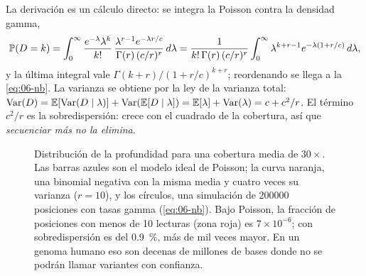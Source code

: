 \begin{simbolos}
\end{simbolos}

La derivación es un cálculo directo: se integra la Poisson contra la densidad gamma,
\[
\mathbb{P}(D=k)=\int_0^\infty \frac{e^{-\lambda}\lambda^k}{k!}\,\frac{\lambda^{r-1}e^{-\lambda r/c}}{\Gamma(r)\,(c/r)^r}\,d\lambda
=\frac{1}{k!\,\Gamma(r)\,(c/r)^r}\int_0^\infty \lambda^{k+r-1}e^{-\lambda(1+r/c)}\,d\lambda,
\]
y la última integral vale $\Gamma(k+r)/(1+r/c)^{k+r}$; reordenando se llega a la \cref{eq:06-nb}. La varianza se obtiene por la ley de la varianza total: $\operatorname{Var}(D)=\mathbb{E}[\operatorname{Var}(D\mid\lambda)]+\operatorname{Var}(\mathbb{E}[D\mid\lambda])=\mathbb{E}[\lambda]+\operatorname{Var}(\lambda)=c+c^2/r$. El término $c^2/r$ es la sobredispersión: crece con el cuadrado de la cobertura, así que \emph{secuenciar más no la elimina}.

\begin{figure}[t]
\centering
{}
\caption[Profundidad: Poisson frente a sobredispersión]{Distribución de la profundidad para una cobertura media de $30\times$. Las barras azules son el modelo ideal de Poisson; la curva naranja, una binomial negativa con la misma media y cuatro veces su varianza ($r=10$), y los círculos, una simulación de \num{200000} posiciones con tasas gamma (\cref{eq:06-nb}). Bajo Poisson, la fracción de posiciones con menos de 10 lecturas (zona roja) es $7\times10^{-6}$; con sobredispersión es del \SI{0,9}{\percent}, más de mil veces mayor. En un genoma humano eso son decenas de millones de bases donde no se podrán llamar variantes con confianza.}
\label{fig:06-prof}
\end{figure}


